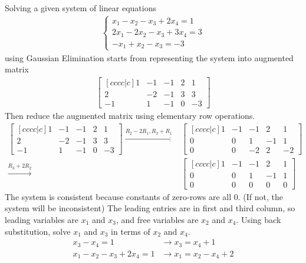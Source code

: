 \noindent Solving a given system of linear equations \begin{align*}
	\begin{cases}
	   	 x_1 -  x_2 - x_3 + 2x_4 = 1 \\
		2x_1 - 2x_2 - x_3 + 3x_4 = 3 \\
		-x_1 +  x_2 - x_3        = -3
	\end{cases}
\end{align*} using Gaussian Elimination starts from representing the system into augmented matrix \begin{align*}
	\begin{bmatrix}[cccc|c]
		 1 & -1 & -1 & 2 &  1 \\
		 2 & -2 & -1 & 3 &  3 \\
		-1 &  1 & -1 & 0 & -3
	\end{bmatrix}
\end{align*}
Then reduce the augmented matrix using elementary row operations.
\begin{align*}
	\begin{bmatrix}[cccc|c]
		1 & -1 & -1 & 2 &  1 \\
		2 & -2 & -1 & 3 &  3 \\
		-1 &  1 & -1 & 0 & -3
	\end{bmatrix} \xrightarrow{R_2 - 2R_1, R_3 + R_1}
	&\begin{bmatrix}[cccc|c]
		1 & -1 & -1 &  2 &  1 \\
		0 &  0 &  1 & -1 &  1 \\
		0 &  0 & -2 &  2 & -2
	\end{bmatrix} \\
	\xrightarrow{R_3 + 2R_2}
	&\begin{bmatrix}[cccc|c]
		1 & -1 & -1 &  2 &  1 \\
		0 &  0 &  1 & -1 &  1 \\
		0 &  0 &  0 &  0 &  0
	\end{bmatrix}
\end{align*}
The system is consistent because constants of zero-rows are all 0. (If not, the system will be inconsistent) The leading entries are in first and third column, so leading variables are $x_1$ and $x_3$, and free variables are $x_2$ and $x_4$. Using back substitution, solve $x_1$ and $x_3$ in terms of $x_2$ and $x_4$.
\begin{align*}
	x_3 - x_4 = 1 &\rightarrow x_3 = x_4 + 1 \\
	x_1 - x_2 - x_3 + 2x_4 = 1 &\rightarrow x_1 = x_2 - x_4 + 2
\end{align*}
